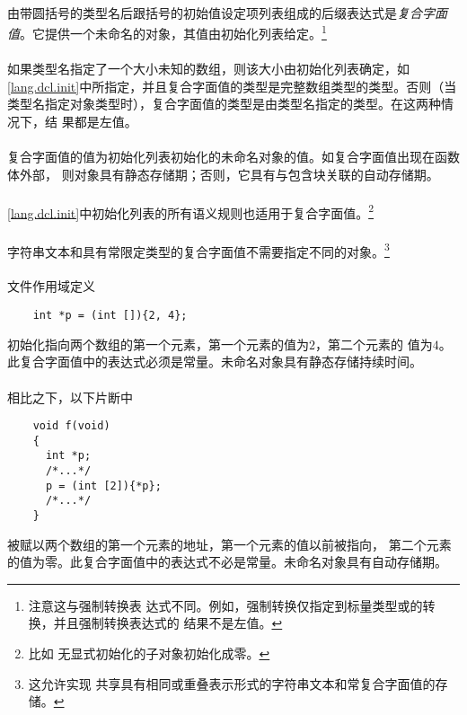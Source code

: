 {\semantic
\paragraph{}
由带圆括号的类型名后跟括号的初始值设定项列表组成的后缀表达式是\textit{复合字面
值}。它提供一个未命名的对象，其值由初始化列表给定。\footnote{注意这与强制转换表
达式不同。例如，强制转换仅指定到标量类型或的转换，并且强制转换表达式的
结果不是左值。}

\paragraph{}
如果类型名指定了一个大小未知的数组，则该大小由初始化列表确定，如
\ref{lang.dcl.init}中所指定，并且复合字面值的类型是完整数组类型的类型。否则（当
类型名指定对象类型时），复合字面值的类型是由类型名指定的类型。在这两种情况下，结
果都是左值。

\paragraph{}
复合字面值的值为初始化列表初始化的未命名对象的值。如复合字面值出现在函数体外部，
则对象具有静态存储期；否则，它具有与包含块关联的自动存储期。

\paragraph{}
\ref{lang.dcl.init}中初始化列表的所有语义规则也适用于复合字面值。\footnote{比如
无显式初始化的子对象初始化成零。}

\paragraph{}
字符串文本和具有常限定类型的复合字面值不需要指定不同的对象。\footnote{这允许实现
共享具有相同或重叠表示形式的字符串文本和常复合字面值的存储。}

\paragraph{}
\ex 文件作用域定义
\begin{lstlisting}
    int *p = (int []){2, 4};
\end{lstlisting}
初始化指向两个数组的第一个元素，第一个元素的值为$2$，第二个元素的
值为$4$。此复合字面值中的表达式必须是常量。未命名对象具有静态存储持续时间。

\paragraph{}
\ex 相比之下，以下片断中
\begin{lstlisting}
    void f(void)
    {
      int *p;
      /*...*/
      p = (int [2]){*p};
      /*...*/
    }
\end{lstlisting}
被赋以两个数组的第一个元素的地址，第一个元素的值以前被指向，
第二个元素的值为零。此复合字面值中的表达式不必是常量。未命名对象具有自动存储期。

}
